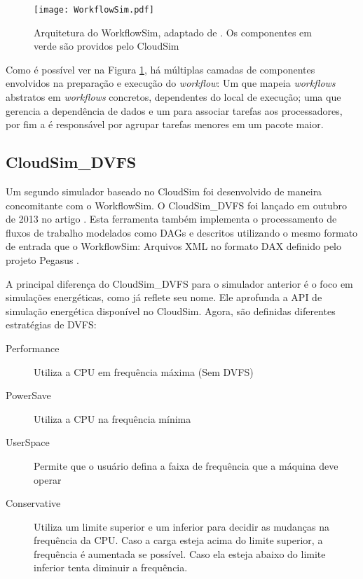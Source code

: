 \begin{figure}[ht]
\centering
\texttt{[image: WorkflowSim.pdf]}
\caption{Arquitetura do WorkflowSim, adaptado de \cite{chen:workflowsim}.
Os componentes em verde são providos pelo CloudSim}
\label{fig:arquitetura_workflowsim}
\end{figure}

Como é possível ver na Figura \ref{fig:arquitetura_workflowsim}, há múltiplas
camadas de componentes envolvidos na preparação e execução do \emph{workflow}:
Um  que mapeia \emph{workflows} abstratos em
\emph{workflows} concretos, dependentes do local de execução; uma  que gerencia a dependência de dados e um  para
associar tarefas aos processadores, por fim a  é
responsável por agrupar tarefas menores em um pacote maior.


\subsection{CloudSim\_DVFS}
\label{subsec:cloudsim_dvfs}

Um segundo simulador baseado no CloudSim foi desenvolvido de maneira
concomitante com o WorkflowSim. O CloudSim\_DVFS foi lançado em outubro de 2013
no artigo \cite{guerout:energy_aware_simulation}. Esta ferramenta também
implementa  o processamento de fluxos de trabalho modelados como DAGs e
descritos utilizando o mesmo formato de entrada que o WorkflowSim: Arquivos XML
no formato DAX definido pelo projeto Pegasus \cite{pegasus:dax}.

A principal diferença do CloudSim\_DVFS para o simulador anterior é o foco em
simulações energéticas, como já reflete seu nome. Ele aprofunda a API de
simulação energética disponível no CloudSim. Agora, são definidas diferentes
estratégias de DVFS:

\begin{description}
  \item[Performance] Utiliza a CPU em frequência máxima (Sem DVFS)
  \item[PowerSave] Utiliza a CPU na frequência mínima
  \item[UserSpace] Permite que o usuário defina a faixa de frequência que
    a máquina deve operar
  \item[Conservative] Utiliza um limite superior e um inferior para decidir
    as mudanças na frequência da CPU. Caso a carga esteja acima do limite
    superior, a frequência é aumentada se possível. Caso ela esteja abaixo
    do limite inferior tenta diminuir a frequência.
\end{description}

